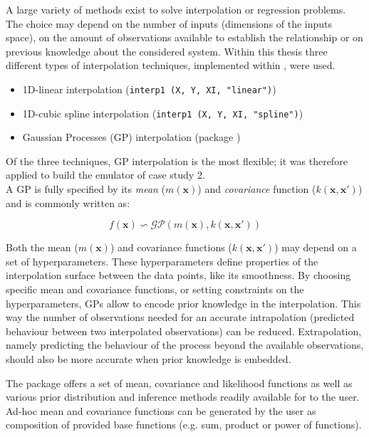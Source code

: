 A large variety of methods exist to solve interpolation or regression problems. The choice may depend on the number of inputs (dimensions of the inputs space), on the amount of observations available to establish the relationship or on previous knowledge about the considered system.
Within this thesis three different types of interpolation techniques, implemented within , were used.

\begin{itemize}
\itemsep0em
  \item 1D-linear interpolation (\texttt{interp1 (X, Y, XI, "linear")})
  \item 1D-cubic spline interpolation (\texttt{interp1 (X, Y, XI, "spline")})
  \item Gaussian Processes (GP) interpolation (package )
\end{itemize}

Of the three techniques, GP interpolation is the most flexible; it was therefore applied to build the emulator of case study 2.\\

A GP is fully specified by its \emph{mean} ($m(\bm{x})$) and \emph{covariance} function ($k(\bm{x},\bm{x}')$) \autocite{rasmussen_gaussian_2006} and is commonly written as:

\begin{equation}
  f(\bm{x}) \backsim \mathcal{GP}\left(m(\bm{x}), k(\bm{x},\bm{x}')\right)
\end{equation}

Both the mean ($m(\bm{x})$) and covariance functions ($k(\bm{x},\bm{x}')$) may depend on a set of hyperparameters. These hyperparameters define properties of the interpolation surface between the data points, like its smoothness.
By choosing specific mean and covariance functions, or setting constraints on the hyperparameters, GPs allow to encode prior knowledge in the interpolation.
This way the number of observations needed for an accurate intrapolation (predicted behaviour between two interpolated observations) can be reduced.
Extrapolation, namely predicting the behaviour of the process beyond the available observations, should also be more accurate when prior knowledge is embedded.

The package  offers a set of mean, covariance and likelihood functions as well as various prior distribution and inference methods readily available for to the user.
Ad-hoc mean and covariance functions can be generated by the user as composition of provided base functions (e.g. sum, product or power of functions).

